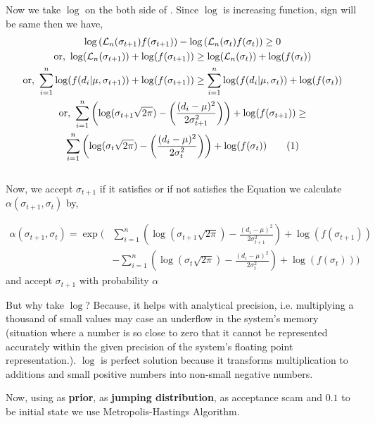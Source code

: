 \begin{example}
	Now we take $ \log $ on the both side of . Since $ \log $ is increasing function, sign will be same then we have,
	\begin{gather*}
		\log \left(  \mathcal{L}_n(\sigma_{t+1})f(\sigma_{t+1}) \right) - \log \left(  \mathcal{L}_n(\sigma_{t})f(\sigma_{t})\right) \ge 0 \\
		\text{or, } \log( \mathcal{L}_n(\sigma_{t+1}) ) + \log(f(\sigma_{t+1})) \ge \log(\mathcal{L}_n(\sigma_t)) + \log(f(\sigma_t)) \\
		\text{or, } \sum_{i=1}^n \log(f(d_i|\mu,\sigma_{t+1})) + \log(f(\sigma_{t+1}))  \ge \sum_{i = 1}^{n} \log(f(d_i|\mu,\sigma_t)) + \log (f(\sigma_t))\\
		\text{or, } \sum_{i = 1}^{n} \left( \log(\sigma_{t+1}\sqrt{2 \pi}) - \left( \frac{(d_i - \mu)^2}{2 \sigma_{t+1}^2} \right) \right) + \log(f(\sigma_{t+1})) \ge \\ \sum_{i = 1}^{n} \left( \log(\sigma_{t}\sqrt{2 \pi}) - \left( \frac{(d_i - \mu)^2}{2 \sigma_{t}^2} \right) \right) + \log(f(\sigma_{t})) \label{eq:2nd accept mh example2} \numberthis
	\end{gather*} \\
	Now, we accept $ \sigma_{t+1} $ if it satisfies  or if not satisfies the Equation we calculate $ \alpha(\sigma_{t+1},\sigma_t) $ by,

	\begin{align*}
		\alpha(\sigma_{t+1}, \sigma_t) = \exp \bigg( & \sum_{i=1}^{n} \left( \log(\sigma_{t+1} \sqrt{2 \pi}) - \frac{(d_i - \mu)^2}{2 \sigma_{t+1}^2} \right) + \log(f(\sigma_{t+1})) \\
		                                             & - \sum_{i=1}^{n} \left( \log(\sigma_t \sqrt{2 \pi}) - \frac{(d_i - \mu)^2}{2 \sigma_t^2} \right) + \log(f(\sigma_t)) \bigg)
	\end{align*}
	and accept $ \sigma_{t+1} $ with probability $ \alpha $

	But why take $ \log $? Because, it helps with analytical precision, i.e. multiplying a thousand of small values may case an underflow in the system's memory (situation where a number is so close to zero that it cannot be represented accurately within the given precision of the system's floating point representation.). $ \log $ is perfect solution because it transforms multiplication to additions and small positive numbers into non-small negative numbers.

	Now, using  as \textbf{prior},  as \textbf{jumping distribution},  as acceptance scam and $0.1$ to be initial state we use Metropolis-Hastings Algorithm.


\end{example}
